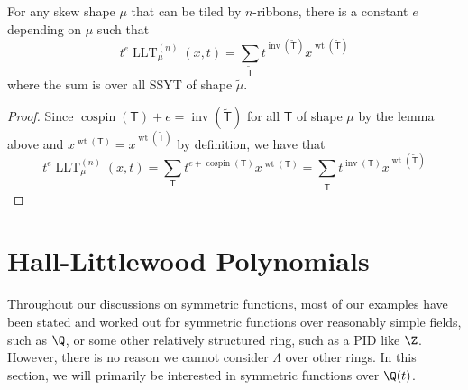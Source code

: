 \documentclass[11pt,leqno,oneside]{amsart}
\numberwithin{thm}{section}
\newcommand{\T}{\mathsf{T}} %
\newcommand{\inv}{\operatorname{inv}}
\newcommand{\sym}{\Lambda}
\newcommand{\cospin}{\operatorname{cospin}}
\newcommand{\wt}{\operatorname{wt}}
\newcommand{\LLT}{\operatorname{LLT}}
\begin{document}
\begin{thm}
  For any skew shape \(\mu\) that can be tiled by \(n\)-ribbons, there
  is a constant \(e\) depending on \(\mu\) such that \[
    t^e \LLT^{(n)}_\mu(x,t) = \sum_{\tilde{\T}} t^{\inv(\tilde{\T})} x^{\wt(\tilde{\T})}
  \]
  where the sum is over all SSYT of shape \(\tilde{\mu}\).
\end{thm}
\begin{proof}
  Since \(\cospin(\T)+e = \inv(\tilde{\T})\) for all \(\T\) of shape
  \(\mu\) by the lemma above and \(x^{\wt(\T)} = x^{\wt(\tilde{\T})}\) by
  definition, we have that \[
    t^e \LLT_\mu^{(n)}(x,t) = \sum_{\T} t^{e+\cospin(\T)} x^{\wt(\T)}
    = \sum_{\tilde{\T}} t^{\inv(\T)} x^{\wt(\tilde{\T})}
  \]
\end{proof}
\section{Hall-Littlewood Polynomials}
Throughout our discussions on symmetric functions, most of our examples
have been stated and worked out for symmetric functions over
reasonably simple fields,
such as \(\Q\), or some other relatively structured ring, such as a
PID like \(\Z\). However, there is no reason we cannot consider
\(\sym\) over other rings. In this section, we will primarily be
interested in symmetric functions over \(\Q(t)\).
\end{document}
